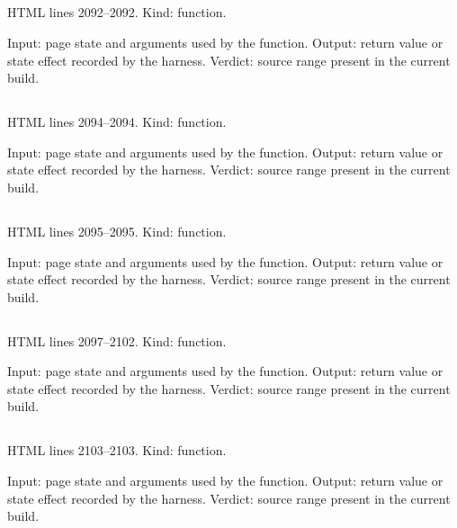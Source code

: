 \subsection*{\texttt{}}
\label{vf_30_mean}
HTML lines 2092--2092. Kind: function.

Input: page state and arguments used by the function.
Output: return value or state effect recorded by the harness.
Verdict: source range present in the current build.

\subsection*{\texttt{}}
\label{vf_31_sd}
HTML lines 2094--2094. Kind: function.

Input: page state and arguments used by the function.
Output: return value or state effect recorded by the harness.
Verdict: source range present in the current build.

\subsection*{\texttt{}}
\label{vf_32_median}
HTML lines 2095--2095. Kind: function.

Input: page state and arguments used by the function.
Output: return value or state effect recorded by the harness.
Verdict: source range present in the current build.

\subsection*{\texttt{}}
\label{vf_33_percentile}
HTML lines 2097--2102. Kind: function.

Input: page state and arguments used by the function.
Output: return value or state effect recorded by the harness.
Verdict: source range present in the current build.

\subsection*{\texttt{}}
\label{vf_34_range}
HTML lines 2103--2103. Kind: function.

Input: page state and arguments used by the function.
Output: return value or state effect recorded by the harness.
Verdict: source range present in the current build.

